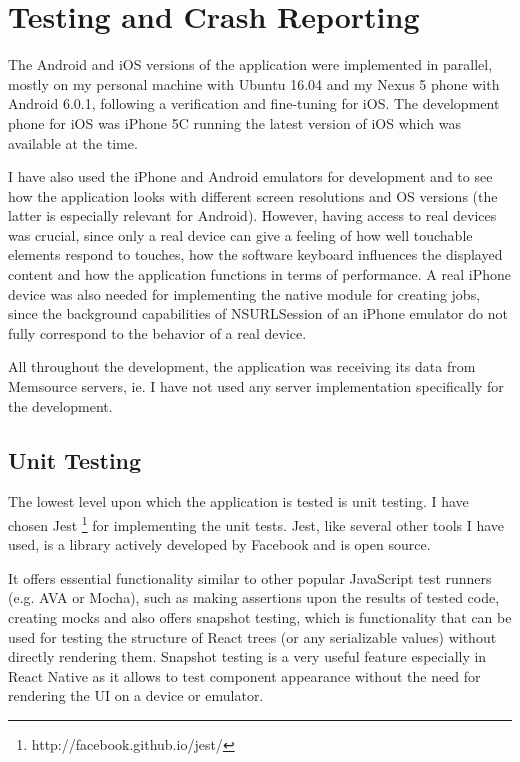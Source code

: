 \chapter{Testing and Crash Reporting}

The Android and iOS versions of the application were implemented in parallel, mostly on my personal machine with Ubuntu 16.04 and my Nexus 5 phone with Android 6.0.1, following a verification and fine-tuning for iOS. The development phone for iOS was iPhone 5C running the latest version of iOS which was available at the time. 

I have also used the iPhone and Android emulators for development and to see how the application looks with different screen resolutions and OS versions (the latter is especially relevant for Android). However, having access to real devices was crucial, since only a real device can give a feeling of how well touchable elements respond to touches, how the software keyboard influences the displayed content and how the application functions in terms of performance. A real iPhone device was also needed for implementing the native module for creating jobs, since the background capabilities of NSURLSession of an iPhone emulator do not fully correspond to the behavior of a real device.

All throughout the development, the application was receiving its data from Memsource servers, ie. I have not used any server implementation specifically for the development.


\section{Unit Testing}
The lowest level upon which the application is tested is unit testing. I have chosen Jest \footnote{http://facebook.github.io/jest/} for implementing the unit tests. Jest, like several other tools I have used, is a library actively developed by Facebook and is open source. 

It offers essential functionality similar to other popular JavaScript test runners (e.g. AVA or Mocha), such as making assertions upon the results of tested code, creating mocks and also offers snapshot testing, which is functionality that can be used for testing the structure of React trees (or any serializable values) without directly rendering them. Snapshot testing is a very useful feature especially in React Native as it allows to test component appearance without the need for rendering the UI on a device or emulator. 

